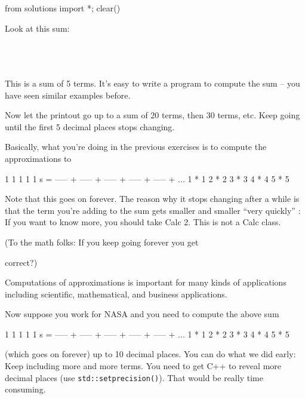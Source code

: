 \begin{python0}
from solutions import *; clear()
\end{python0}

Look at this sum:

\\
\\
\\

This is a sum of 5 terms. It's easy to write a program
to compute the sum -- you have seen similar examples before.



Now let the printout go up to a sum of 20 terms, then 30 terms, etc.
Keep going until the first 5 decimal places stops changing.

Basically, what you're doing in the previous exercises
is to compute the approximations to
\begin{console}
      1       1       1       1       1
s = ----- + ----- + ----- + ----- + ----- + ...
    1 * 1   2 * 2   3 * 3   4 * 4   5 * 5
\end{console}
Note that this goes on forever. The reason why it stops changing after a
while is that the term you're adding to the sum gets
smaller and smaller ``very quickly'' :
If you want to know more, you should take Calc 2. This is not a Calc
class.

(To the math folks: If you keep going forever you get


correct?)

Computations of approximations is important for many kinds of
applications including scientific, mathematical, and business
applications.

Now suppose you work for NASA and you need to compute the above sum
\begin{console}
      1       1       1       1       1
s = ----- + ----- + ----- + ----- + ----- + ...
    1 * 1   2 * 2   3 * 3   4 * 4   5 * 5
\end{console}
(which goes on forever) up to 10 decimal places. You can do what we did
early: Keep including more and more terms. You need to get C++ to reveal
more decimal places (use \texttt{std::setprecision()}). That would be
really time consuming.


